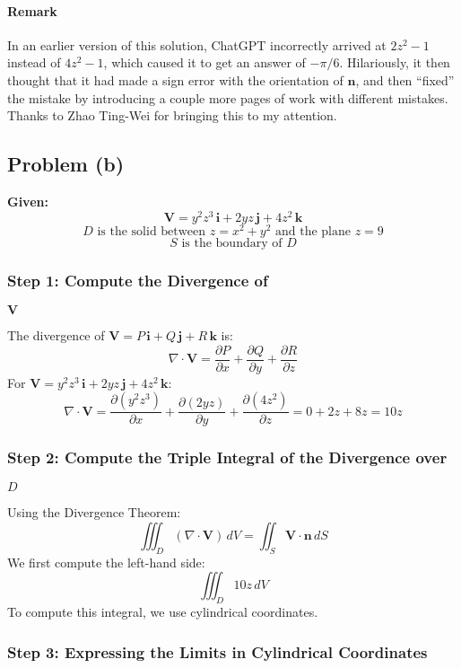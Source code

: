 \documentclass[11pt]{article}
\begin{document}
\paragraph{Remark}
In an earlier version of this solution, ChatGPT incorrectly arrived at $2z^2-1$
instead of $4z^2-1$, which caused it to get an answer of $-\pi/6$.
Hilariously, it then thought that it had made a sign error with the orientation of $\mathbf{n}$,
and then ``fixed'' the mistake by introducing a couple more pages of work with different mistakes.
Thanks to Zhao Ting-Wei for bringing this to my attention.

\newpage

\subsection{Problem (b)}

\textbf{Given:}
\[
\mathbf{V} = y^2 z^3\,\mathbf{i} + 2 y z\,\mathbf{j} + 4 z^2\,\mathbf{k}
\]
\[
D \text{ is the solid between } z = x^2 + y^2 \text{ and the plane } z = 9
\]
\[
S \text{ is the boundary of } D
\]

\subsubsection*{Step 1: Compute the Divergence of } $\mathbf{V}$

The divergence of \( \mathbf{V} = P\,\mathbf{i} + Q\,\mathbf{j} + R\,\mathbf{k} \) is:
\[
\nabla \cdot \mathbf{V} = \frac{\partial P}{\partial x} + \frac{\partial Q}{\partial y} + \frac{\partial R}{\partial z}
\]
For \( \mathbf{V} = y^2 z^3\,\mathbf{i} + 2 y z\,\mathbf{j} + 4 z^2\,\mathbf{k} \):
\[
\nabla \cdot \mathbf{V} = \frac{\partial (y^2 z^3)}{\partial x} + \frac{\partial (2 y z)}{\partial y} + \frac{\partial (4 z^2)}{\partial z} = 0 + 2 z + 8 z = 10 z
\]

\subsubsection*{Step 2: Compute the Triple Integral of the Divergence over } $D$

Using the Divergence Theorem:
\[
\iiint_{D} (\nabla \cdot \mathbf{V}) \, dV = \iint_{S} \mathbf{V} \cdot \mathbf{n} \, dS
\]
We first compute the left-hand side:
\[
\iiint_{D} 10 z \, dV
\]
To compute this integral, we use cylindrical coordinates.

\subsubsection*{Step 3: Expressing the Limits in Cylindrical Coordinates}
\end{document}
